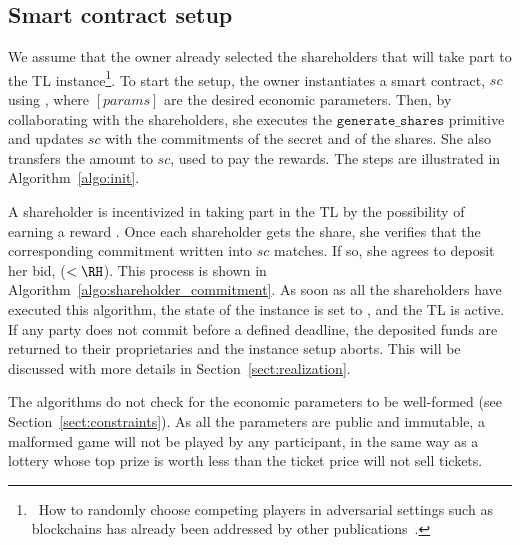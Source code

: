 \subsection{Smart contract setup}\label{sect:sc_init}

We assume that the owner already selected the shareholders that will take part to the TL instance\footnote{\ How to randomly choose competing players in adversarial settings such as blockchains has already been addressed by other publications~\cite{dong2017betrayal,10.1007/978-3-030-01177-2_81}.}.
To start the setup, the owner instantiates a smart contract, $sc$ using \priminit{[params]}, where $[params]$ are the desired economic parameters.
Then, by collaborating with the shareholders, she executes the $\texttt{generate\_shares}$ primitive and updates $sc$ with the commitments of the secret and of the shares.
She also transfers the amount \PO to $sc$, used to pay the rewards.
The steps are illustrated in Algorithm~\ref{algo:init}.

A shareholder \shareholder is incentivized in taking part in the TL by the possibility of earning a reward \RH.
Once each shareholder gets the share, she verifies that the corresponding commitment written into $sc$ matches. 
If so, she agrees to deposit her bid, \BH ($<\RH$). 
This process is shown in Algorithm~\ref{algo:shareholder_commitment}.
%
As soon as all the shareholders have executed this algorithm, the state of the instance is set to \statelocked, and the TL is active. 
If any party does not commit before a defined deadline, the deposited funds are returned to their proprietaries and the instance setup aborts. This will be discussed with more details in Section~\ref{sect:realization}.

The algorithms do not check for the economic parameters to be well-formed (see Section~\ref{sect:constraints}). 
As all the parameters are public and immutable, a malformed game will not be played by any participant, in the same way as a lottery whose top prize is worth less than the ticket price will not sell tickets.


